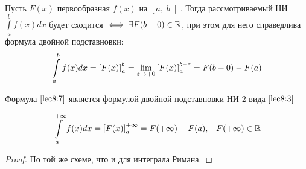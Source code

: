 \documentclass[../../main.tex]{subfiles}
\begin{document}
\begin{thm}
Пусть $F(x)$ первообразная $f(x)$ на $\left[a,\; b\right[$. Тогда 
рассмотриваемый НИ $\displaystyle\int\limits_{a}^{b}f(x)dx$ будет сходится 
$\iff \exists F(b-0)\in \mathbb{R}$, при этом для него справедлива формула двойной 
подставновки:
\begin{equation}\label{lec8:7}
\int\limits_{a}^{b}f(x)dx = \left[F(x)\right]_{a}^{b} = \underset{\varepsilon \to 
+0}\lim\left[F(x)\right]_{a}^{b - \varepsilon} = F(b - 0) - F(a) 
\end{equation}

Формула $\eqref{lec8:7}$ является формулой двойной подставновки НИ-2 вида 
$\eqref{lec8:3}$

\begin{equation}\label{lec8:8}
\int\limits_{a}^{+\infty}f(x)dx = \left[F(x)\right]_{a}^{+\infty} = F(+\infty) 
- F(a), \;\;\; F(+\infty) \in \mathbb{R} 
\end{equation}
\end{thm}

\begin{proof}
По той же схеме, что и для интеграла Римана.
\end{proof}
\end{document}

